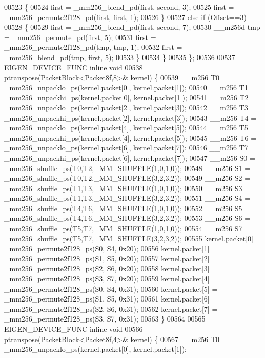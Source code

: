 \begin{DoxyCode}
{{00523     \{
00524       first = \_mm256\_blend\_pd(first, second, 3);
00525       first = \_mm256\_permute2f128\_pd(first, first, 1);
00526     \}
00527     \textcolor{keywordflow}{else} \textcolor{keywordflow}{if} (Offset==3)
00528     \{
00529       first = \_mm256\_blend\_pd(first, second, 7);
00530       \_\_m256d tmp = \_mm256\_permute\_pd(first, 5);
00531       first = \_mm256\_permute2f128\_pd(tmp, tmp, 1);
00532       first = \_mm256\_blend\_pd(tmp, first, 5);
00533     \}
00534   \}
00535 \};
00536 
00537 EIGEN\_DEVICE\_FUNC \textcolor{keyword}{inline} \textcolor{keywordtype}{void}
00538 ptranspose(PacketBlock<Packet8f,8>& kernel) \{
00539   \_\_m256 T0 = \_mm256\_unpacklo\_ps(kernel.packet[0], kernel.packet[1]);
00540   \_\_m256 T1 = \_mm256\_unpackhi\_ps(kernel.packet[0], kernel.packet[1]);
00541   \_\_m256 T2 = \_mm256\_unpacklo\_ps(kernel.packet[2], kernel.packet[3]);
00542   \_\_m256 T3 = \_mm256\_unpackhi\_ps(kernel.packet[2], kernel.packet[3]);
00543   \_\_m256 T4 = \_mm256\_unpacklo\_ps(kernel.packet[4], kernel.packet[5]);
00544   \_\_m256 T5 = \_mm256\_unpackhi\_ps(kernel.packet[4], kernel.packet[5]);
00545   \_\_m256 T6 = \_mm256\_unpacklo\_ps(kernel.packet[6], kernel.packet[7]);
00546   \_\_m256 T7 = \_mm256\_unpackhi\_ps(kernel.packet[6], kernel.packet[7]);
00547   \_\_m256 S0 = \_mm256\_shuffle\_ps(T0,T2,\_MM\_SHUFFLE(1,0,1,0));
00548   \_\_m256 S1 = \_mm256\_shuffle\_ps(T0,T2,\_MM\_SHUFFLE(3,2,3,2));
00549   \_\_m256 S2 = \_mm256\_shuffle\_ps(T1,T3,\_MM\_SHUFFLE(1,0,1,0));
00550   \_\_m256 S3 = \_mm256\_shuffle\_ps(T1,T3,\_MM\_SHUFFLE(3,2,3,2));
00551   \_\_m256 S4 = \_mm256\_shuffle\_ps(T4,T6,\_MM\_SHUFFLE(1,0,1,0));
00552   \_\_m256 S5 = \_mm256\_shuffle\_ps(T4,T6,\_MM\_SHUFFLE(3,2,3,2));
00553   \_\_m256 S6 = \_mm256\_shuffle\_ps(T5,T7,\_MM\_SHUFFLE(1,0,1,0));
00554   \_\_m256 S7 = \_mm256\_shuffle\_ps(T5,T7,\_MM\_SHUFFLE(3,2,3,2));
00555   kernel.packet[0] = \_mm256\_permute2f128\_ps(S0, S4, 0x20);
00556   kernel.packet[1] = \_mm256\_permute2f128\_ps(S1, S5, 0x20);
00557   kernel.packet[2] = \_mm256\_permute2f128\_ps(S2, S6, 0x20);
00558   kernel.packet[3] = \_mm256\_permute2f128\_ps(S3, S7, 0x20);
00559   kernel.packet[4] = \_mm256\_permute2f128\_ps(S0, S4, 0x31);
00560   kernel.packet[5] = \_mm256\_permute2f128\_ps(S1, S5, 0x31);
00561   kernel.packet[6] = \_mm256\_permute2f128\_ps(S2, S6, 0x31);
00562   kernel.packet[7] = \_mm256\_permute2f128\_ps(S3, S7, 0x31);
00563 \}
00564 
00565 EIGEN\_DEVICE\_FUNC \textcolor{keyword}{inline} \textcolor{keywordtype}{void}
00566 ptranspose(PacketBlock<Packet8f,4>& kernel) \{
00567   \_\_m256 T0 = \_mm256\_unpacklo\_ps(kernel.packet[0], kernel.packet[1]);
}}
\end{DoxyCode}
